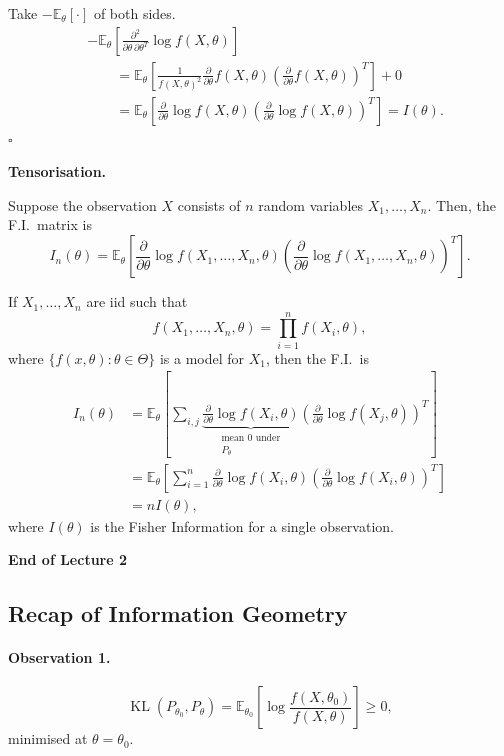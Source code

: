 \documentclass[11pt,a4paper]{article}
\begin{document}
Take $-\mathbb{E}_{\theta}[\cdot]$ of both sides.
\[
\begin{aligned}
&-\mathbb{E}_{\theta}
\left[
\frac{\partial^2}{\partial\theta\,\partial\theta^T}
\log f(X,\theta)
\right]
\\
&\qquad=
\mathbb{E}_{\theta}
\left[
\frac{1}{f(X,\theta)^2}
\frac{\partial}{\partial\theta}f(X,\theta)
\left(
\frac{\partial}{\partial\theta}f(X,\theta)
\right)^T
\right]
+0
\\
&\qquad=
\mathbb{E}_{\theta}
\left[
\frac{\partial}{\partial\theta}\log f(X,\theta)
\left(
\frac{\partial}{\partial\theta}\log f(X,\theta)
\right)^T
\right]
=
I(\theta).
\end{aligned}
\]
\hfill$\square$

\medskip
\noindent\textbf{Tensorisation.}

Suppose the observation $X$ consists of $n$ random variables
$X_1,\ldots,X_n$. Then, the F.I.\ matrix is
\[
I_n(\theta)
=
\mathbb{E}_{\theta}
\left[
\frac{\partial}{\partial\theta}
\log f(X_1,\ldots,X_n,\theta)
\left(
\frac{\partial}{\partial\theta}
\log f(X_1,\ldots,X_n,\theta)
\right)^T
\right].
\]

If $X_1,\ldots,X_n$ are iid such that
\[
f(X_1,\ldots,X_n,\theta)
=
\prod_{i=1}^{n}f(X_i,\theta),
\]
where $\{f(x,\theta):\theta\in\Theta\}$ is a model for $X_1$,
then the F.I.\ is
\[
\begin{aligned}
I_n(\theta)
&=
\mathbb{E}_{\theta}
\left[
\sum_{i,j}
\underbrace{
\frac{\partial}{\partial\theta}\log f(X_i,\theta)
}_{\substack{\text{mean }0\text{ under}\\P_\theta}}
\left(
\frac{\partial}{\partial\theta}\log f(X_j,\theta)
\right)^T
\right]
\\
&=
\mathbb{E}_{\theta}
\left[
\sum_{i=1}^{n}
\frac{\partial}{\partial\theta}\log f(X_i,\theta)
\left(
\frac{\partial}{\partial\theta}\log f(X_i,\theta)
\right)^T
\right]
\\
&=
nI(\theta),
\end{aligned}
\]
where $I(\theta)$ is the Fisher Information for a single observation.

\begin{center}
\textbf{End of Lecture 2}
\end{center}

\subsection*{Recap of Information Geometry}

\paragraph{Observation 1.}
\[
\operatorname{KL}(P_{\theta_0},P_\theta)
=
\mathbb{E}_{\theta_0}
\left[
\log\frac{f(X,\theta_0)}{f(X,\theta)}
\right]
\geq 0,
\]
minimised at $\theta=\theta_0$.
\end{document}
